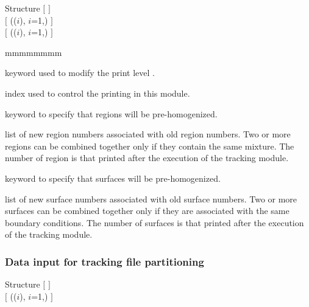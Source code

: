 \begin{DataStructure}{Structure }
$[$   $]$ \\
$[$  (($i$), $i$=1,) $]$ \\
$[$  (($i$), $i$=1,) $]$ 
\end{DataStructure}

\begin{ListeDeDescription}{mmmmmmmm}   

\item[\moc{EDIT}] keyword used to modify the print level .

\item[\dusa{iprint}] index used to control the printing in this module. 

\item[\moc{REGI}] keyword to specify that regions will be pre-homogenized.

\item[\dusa{irmrg}] list of new region numbers associated with old region numbers. Two or more regions can be
combined together only if they contain the same mixture. The number  of region is that printed
after the execution of the tracking module.

\item[\moc{SURF}] keyword to specify that surfaces will be pre-homogenized.

\item[\dusa{ismrg}] list of new surface numbers associated with old surface numbers. Two or more surfaces can be
combined together only if they are associated with the same boundary conditions. The number  of surfaces is
that printed after the execution of the tracking module.

\end{ListeDeDescription}

\subsubsection{Data input for tracking file partitioning}\label{sect:descextr}

\begin{DataStructure}{Structure }
$[$   $]$ \\
$[$  (($i$), $i$=1,) $]$ \\
\end{DataStructure}

